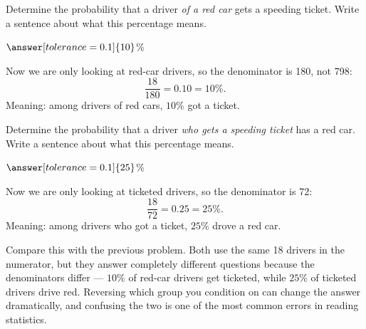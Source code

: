 \documentclass[12pt]{ximera}
\begin{document}
\begin{problem}
Determine the probability that a driver \emph{of a red car} gets a speeding ticket.
Write a sentence about what this percentage means.

$\answer[tolerance=0.1]{10}$\%

\begin{freeResponse}
\end{freeResponse}

\begin{solution}
Now we are only looking at red-car drivers, so the denominator is 180, not 798:
\[
\frac{18}{180} = 0.10 = 10\%.
\]
Meaning: among drivers of red cars, $10\%$ got a ticket.
\end{solution}
\end{problem}

\begin{problem}
Determine the probability that a driver \emph{who gets a speeding ticket} has a red car.
Write a sentence about what this percentage means.

$\answer[tolerance=0.1]{25}$\%

\begin{freeResponse}
\end{freeResponse}

\begin{solution}
Now we are only looking at ticketed drivers, so the denominator is 72:
\[
\frac{18}{72} = 0.25 = 25\%.
\]
Meaning: among drivers who got a ticket, $25\%$ drove a red car.

Compare this with the previous problem. Both use the same 18 drivers in the numerator,
but they answer completely different questions because the denominators differ --- $10\%$
of red-car drivers get ticketed, while $25\%$ of ticketed drivers drive red. Reversing
which group you condition on can change the answer dramatically, and confusing the two is
one of the most common errors in reading statistics.
\end{solution}
\end{problem}
\end{document}
